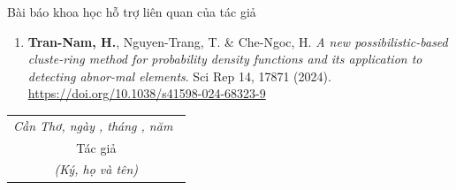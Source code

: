Bài báo khoa học hỗ trợ liên quan của tác giả

\begin{enumerate}[label=(\roman*)]
\item \textbf{Tran-Nam, H.}, Nguyen-Trang, T. \& Che-Ngoc, H. \textit{A new possibilistic-based cluste-ring method for probability density functions and its application to detecting abnor-mal elements}. Sci Rep 14, 17871 (2024). {\footnotesize \url{https://doi.org/10.1038/s41598-024-68323-9}}
\end{enumerate}

\hspace*{\fill}
\begin{tabular}{@{}c@{}} 
	\\\it 
	Cần Thơ, ngày \quad, tháng \quad, năm \qquad\,\\
	Tác giả\\
	\textit{(Ký, họ và tên)}
	
\end{tabular}
